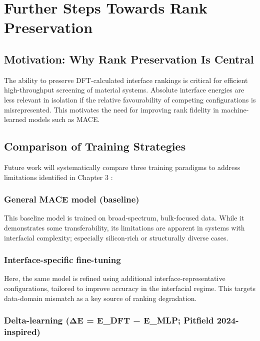 \section{Further Steps Towards Rank Preservation} \label{section:rank_preservation}

\subsection{Motivation: Why Rank Preservation Is Central}

The ability to preserve DFT-calculated interface rankings is critical for efficient high-throughput screening of material systems. Absolute interface energies are less relevant in isolation if the relative favourability of competing configurations is misrepresented. This motivates the need for improving rank fidelity in machine-learned models such as MACE.

\subsection{Comparison of Training Strategies}

Future work will systematically compare three training paradigms to address limitations identified in Chapter 3 :

\subsubsection{General MACE model (baseline)}

This baseline model is trained on broad-spectrum, bulk-focused data. While it demonstrates some transferability, its limitations are apparent in systems with interfacial complexity; especially silicon-rich or structurally diverse cases.

\subsubsection{Interface-specific fine-tuning}

Here, the same model is refined using additional interface-representative configurations, tailored to improve accuracy in the interfacial regime. This targets data-domain mismatch as a key source of ranking degradation.

\subsubsection{Delta-learning (ΔE = E\_DFT − E\_MLP; Pitfield 2024-inspired)}

